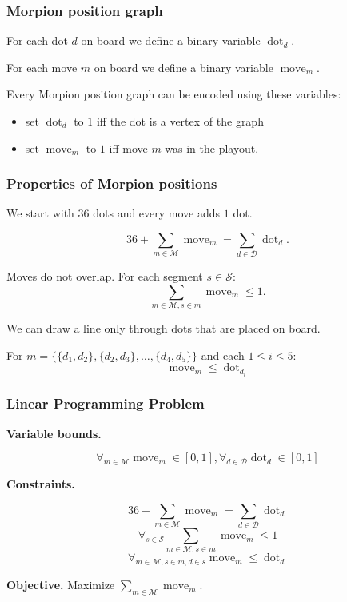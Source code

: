 \documentclass[pdftex]{beamer}
\DeclareMathOperator{\mv}{move}
\DeclareMathOperator{\dt}{dot}
\begin{document}
\begin{frame}
\frametitle{Morpion position graph}

For each dot $d$ on board we define a binary variable $\dt_d$.

For each move $m$ on board we define a binary variable $\mv_m$.

\vspace*{-7mm}
\begin{center}
  
\end{center}

\vspace*{-7mm}
Every Morpion position graph can be encoded using these variables:
\vspace*{-4mm}
\begin{itemize}
  \item set $\dt_d$ to $1$ iff the dot is a vertex of the graph
  \item set $\mv_m$ to $1$ iff move $m$ was in the playout.
\end{itemize}

\end{frame}

\begin{frame}
\frametitle{Properties of Morpion positions}

We start with $36$ dots and every move adds $1$ dot.

\[
  36 + \sum_{m \in \mathcal{M}} \mv_m = \sum_{d \in \mathcal{D}} \dt_d.
\]

\pause\vspace{3mm}
Moves do not overlap. For each segment $s \in \mathcal{S}$:
\[
  \sum_{m \in \mathcal{M}, s \in m} \mv_m \leq 1.
\]

\pause\vspace{3mm}
We can draw a line only through dots that are placed on board.

For $m =  \{ \{ d_1, d_2 \}, \{ d_2, d_3 \}, \ldots, \{ d_4, d_5 \} \}$ and each $1 \leq i \leq 5$:
\[
   \mv_m \leq \dt_{d_i}
\]

\end{frame}

\begin{frame}
\frametitle{Linear Programming Problem}

{\bf Variable bounds.}

\[ \forall_{m \in \mathcal{M}} \mv_m \in [0, 1], \forall_{d \in \mathcal{D}}  \dt_d \in [0, 1] \]

{\bf Constraints.}

\[ 36 + \sum_{m \in \mathcal{M}} \mv_m = \sum_{d \in \mathcal{D}} \dt_d \]  
\[ \forall_{s \in \mathcal{S}} \sum_{m \in \mathcal{M}, s \in m} \mv_m \leq 1 \]
\[ \forall_{m \in \mathcal{M}, s \in m, d \in s} \mv_m \leq \dt_d \]

\vspace{2mm}
{\bf Objective.} Maximize $\displaystyle \sum_{m \in \mathcal{M}} \mv_m$.
\end{frame}
\end{document}
